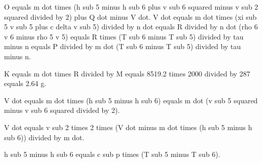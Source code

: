 O equals m dot times (h sub 5 minus h sub 6 plus v sub 6 squared minus v sub 2 squared divided by 2) plus Q dot minus V dot. 
V dot equals m dot times (xi sub 5 v sub 5 plus c delta v sub 5) divided by n dot equals R divided by n dot (rho 6 v 6 minus rho 5 v 5) equals R times (T sub 6 minus T sub 5) divided by tau minus n equals P divided by m dot (T sub 6 minus T sub 5) divided by tau minus n.

K equals m dot times R divided by M equals 8519.2 times 2000 divided by 287 equals 2.64 g.

V dot equals m dot times (h sub 5 minus h sub 6) equals m dot (v sub 5 squared minus v sub 6 squared divided by 2).

V dot equals v sub 2 times 2 times (V dot minus m dot times (h sub 5 minus h sub 6)) divided by m dot.

h sub 5 minus h sub 6 equals c sub p times (T sub 5 minus T sub 6).